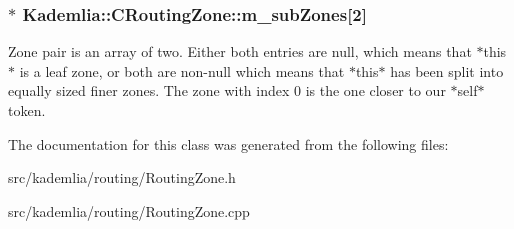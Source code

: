 \subsubsection[{m\_\-subZones}]{$\ast$ {\bf Kademlia::CRoutingZone::m\_\-subZones}[2]\hspace{0.3cm}{\ttfamily  [private]}}\label{classKademlia_1_1CRoutingZone_ab0c0f79fd6e6799f25cae1edec733ee3}


Zone pair is an array of two. Either both entries are null, which means that $\ast$this$\ast$ is a leaf zone, or both are non-\/null which means that $\ast$this$\ast$ has been split into equally sized finer zones. The zone with index 0 is the one closer to our $\ast$self$\ast$ token. 

The documentation for this class was generated from the following files:\begin{DoxyCompactItemize}
\item 
src/kademlia/routing/RoutingZone.h\item 
src/kademlia/routing/RoutingZone.cpp\end{DoxyCompactItemize}
